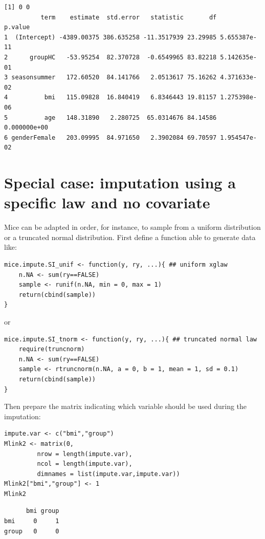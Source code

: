 \documentclass[12pt]{article}
\begin{document}
\begin{verbatim}
[1] 0 0
          term    estimate  std.error   statistic       df      p.value
1  (Intercept) -4389.00375 386.635258 -11.3517939 23.29985 5.655387e-11
2      groupHC   -53.95254  82.370728  -0.6549965 83.82218 5.142635e-01
3 seasonsummer   172.60520  84.141766   2.0513617 75.16262 4.371633e-02
4          bmi   115.09828  16.840419   6.8346443 19.81157 1.275398e-06
5          age   148.31890   2.280725  65.0314676 84.14586 0.000000e+00
6 genderFemale   203.09995  84.971650   2.3902084 69.70597 1.954547e-02
\end{verbatim}


\clearpage

\section{Special case: imputation using a specific law and no covariate}
\label{sec:orgf6314bc}
Mice can be adapted in order, for instance, to sample from a uniform
distribution or a truncated normal distribution. First define a
function able to generate data like:
\lstset{language=r,label= ,caption= ,captionpos=b,numbers=none}
\begin{lstlisting}
mice.impute.SI_unif <- function(y, ry, ...){ ## uniform xglaw
    n.NA <- sum(ry==FALSE)
    sample <- runif(n.NA, min = 0, max = 1)
    return(cbind(sample))
}
\end{lstlisting}

or

\lstset{language=r,label= ,caption= ,captionpos=b,numbers=none}
\begin{lstlisting}
mice.impute.SI_tnorm <- function(y, ry, ...){ ## truncated normal law
    require(truncnorm)
    n.NA <- sum(ry==FALSE)
    sample <- rtruncnorm(n.NA, a = 0, b = 1, mean = 1, sd = 0.1)
    return(cbind(sample))
}
\end{lstlisting}
Then prepare the matrix indicating which variable should be used
during the imputation:
\lstset{language=r,label= ,caption= ,captionpos=b,numbers=none}
\begin{lstlisting}
impute.var <- c("bmi","group")
Mlink2 <- matrix(0, 
		 nrow = length(impute.var), 
		 ncol = length(impute.var), 
		 dimnames = list(impute.var,impute.var))
Mlink2["bmi","group"] <- 1
Mlink2
\end{lstlisting}

\begin{verbatim}
      bmi group
bmi     0     1
group   0     0
\end{verbatim}
\end{document}
